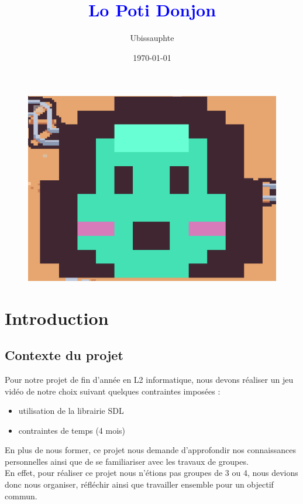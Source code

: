 \documentclass[a4paper,11pt]{article}
\begin{document}
\title{\huge{\textbf{\textcolor{blue}{Lo Poti Donjon}}}}
\author{\Large{Ubissauphte}}
\date{\today}
\maketitle

\begin{figure}[ht]
\centering
\includegraphics[width=0.8\linewidth]{./img/pablo.png}
\label{fig:map_gen32}
\end{figure}
\bigskip
\newpage
\tableofcontents
\newpage

\section{Introduction}
\subsection{Contexte du projet}

Pour notre projet de fin d'année en L2 informatique, nous devons réaliser un jeu vidéo de notre choix suivant quelques contraintes imposées :

\begin{itemize}
    \item utilisation de la librairie SDL
    \item contraintes de temps (4 mois)
\end{itemize}
En plus de nous former, ce projet nous demande d'approfondir nos connaissances personnelles ainsi que de se familiariser avec les travaux de groupes.\\
En effet, pour réaliser ce projet nous n'étions pas groupes de 3 ou 4, nous devions donc nous organiser, réfléchir ainsi que travailler ensemble pour un objectif commun.
\end{document}
